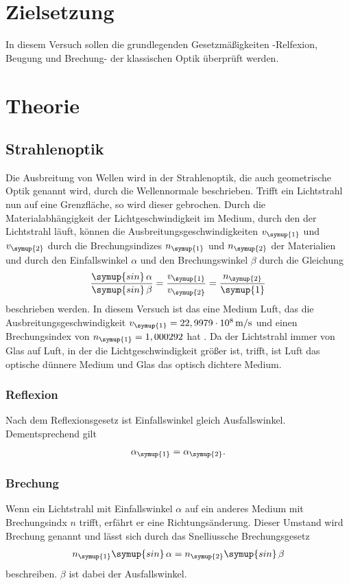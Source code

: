 \section{Zielsetzung}
\label{sec:Zielsetzung}
In diesem Versuch sollen die grundlegenden Gesetzmäßigkeiten -Relfexion, Beugung und Brechung- der klassischen Optik überprüft werden.

\section{Theorie}
\label{sec:Theorie}

\subsection{Strahlenoptik}
\label{sec:Strahlenoptik}
Die Ausbreitung von Wellen wird in der Strahlenoptik, die auch geometrische Optik genannt wird, durch die Wellennormale beschrieben.
Trifft ein Lichtstrahl nun auf eine Grenzfläche, so wird dieser gebrochen. Durch die Materialabhängigkeit der Lichtgeschwindigkeit im
Medium, durch den der Lichtstrahl läuft, können die Ausbreitungsgeschwindigkeiten $v_{\symup{1}}$ und $v_{\symup{2}}$ durch die
Brechungsindizes $n_{\symup{1}}$ und $n_{\symup{2}}$ der Materialien und durch den Einfallswinkel $\alpha$ und den Brechungswinkel
$\beta$ durch die Gleichung
\begin{align*}
    \frac{\symup{sin}\,\alpha}{\symup{sin}\,\beta} = \frac{v_{\symup{1}}}{v_{\symup{2}}} = \frac{n_{\symup{2}}}{\symup{1}}
\end{align*}
beschrieben werden. In diesem Versuch ist das eine Medium Luft, das die Ausbreitungsgeschwindigkeit $v_{\symup{1}} = 22,9979 \cdot
10^{8}\,\unit{\meter\per\second}$ und einen Brechungsindex von $n_{\symup{1}} = 1,000292$ hat \cite{sample}. Da der Lichtstrahl 
immer von Glas auf Luft, in der die Lichtgeschwindigkeit größer ist, trifft, ist Luft das optische dünnere Medium und Glas das
optisch dichtere Medium.

\subsubsection{Reflexion}
\label{sec:Reflexion}
Nach dem Reflexionsgesetz ist Einfallswinkel gleich Ausfallswinkel. Dementsprechend gilt
\begin{align}
    \label{eqn:Reflexion}
    \alpha_{\symup{1}} = \alpha_{\symup{2}}.
\end{align}

\subsubsection{Brechung}
\label{sec:Brechung}
Wenn ein Lichtstrahl mit Einfallswinkel $\alpha$ auf ein anderes Medium mit Brechungsindx $n$ trifft,
erfährt er eine Richtungsänderung. Dieser Umstand wird Brechung genannt und lässt sich durch das Snelliussche 
Brechungsgesetz
\begin{align}
    \label{eqn:Snellius}
    n_{\symup{1}}\symup{sin}\,\alpha = n_{\symup{2}}\symup{sin}\,\beta
\end{align}
beschreiben. $\beta$ ist dabei der Ausfallswinkel.

